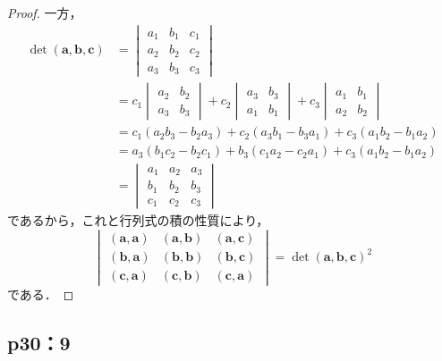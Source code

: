 \documentclass[uplatex,dvipdfmx,a4paper,10pt,fleqn]{jsarticle}
\begin{document}
\begin{tleftbar}
\begin{proof}
    一方，
    \begin{align*}
        \det (\bm{a},\bm{b},\bm{c})&=
        \begin{vmatrix}
            a_1 & b_1 & c_1 \\
            a_2 & b_2 & c_2 \\
            a_3 & b_3 & c_3
        \end{vmatrix} \\
        & = c_1
        \begin{vmatrix}
            a_2 & b_2 \\
            a_3 & b_3 
        \end{vmatrix}
        + c_2
        \begin{vmatrix}
            a_3 & b_3 \\
            a_1 & b_1
        \end{vmatrix}
        + c_3
        \begin{vmatrix}
            a_1 & b_1 \\
            a_2 & b_2
        \end{vmatrix}
        \\
        & = c_1 (a_2 b_3-b_2 a_3)+c_2 (a_3 b_1 - b_3 a_1)+c_3 (a_1 b_2 -b_1 a_2)\\
        & = a_3 (b_1 c_2 - b_2 c_1)+b_3 (c_1 a_2-c_2 a_1)+ c_3 (a_1 b_2 - b_1 a_2)\\
        & =
        \begin{vmatrix}
            a_1 & a_2 & a_3 \\
            b_1 & b_2 & b_3 \\
            c_1 & c_2 & c_3
        \end{vmatrix}
    \end{align*}
    であるから，これと行列式の積の性質により，
    \[
        \begin{vmatrix}
            (\bm{a},\bm{a}) & (\bm{a},\bm{b}) & (\bm{a},\bm{c}) \\
            (\bm{b},\bm{a}) & (\bm{b},\bm{b}) & (\bm{b},\bm{c}) \\
            (\bm{c},\bm{a}) & (\bm{c},\bm{b}) & (\bm{c},\bm{a})
        \end{vmatrix}
        = {\det (\bm{a},\bm{b},\bm{c})}^2
    \]
    である．
    \end{proof}
\end{tleftbar}

\subsection*{p30：9}
\end{document}
